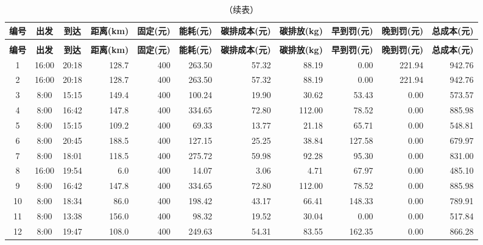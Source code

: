 \begin{landscape}
\scriptsize
\setlength{\tabcolsep}{3pt}
\begin{longtable}{|c|c|c|r|r|r|r|r|r|r|r|}
\caption{问题二完整调度方案（时间与成本明细，共163辆次）} \\
\hline
\rowcolor{gray!25}
\textbf{编号} & \textbf{出发} & \textbf{到达} & \textbf{距离(km)} & \textbf{固定(元)} & \textbf{能耗(元)} & \textbf{碳排成本(元)} & \textbf{碳排放(kg)} & \textbf{早到罚(元)} & \textbf{晚到罚(元)} & \textbf{总成本(元)} \\
\hline
\endfirsthead
\caption[]{（续表）} \\
\hline
\rowcolor{gray!25}
\textbf{编号} & \textbf{出发} & \textbf{到达} & \textbf{距离(km)} & \textbf{固定(元)} & \textbf{能耗(元)} & \textbf{碳排成本(元)} & \textbf{碳排放(kg)} & \textbf{早到罚(元)} & \textbf{晚到罚(元)} & \textbf{总成本(元)} \\
\hline
\endhead
\hline \endfoot
\hline \endlastfoot
\rowcolor{gray!8}
1 & 16:00 & 20:18 & 128.7 & 400 & 263.50 & 57.32 & 88.19 & 0.00 & 221.94 & 942.76 \\
\hline
2 & 16:00 & 20:18 & 128.7 & 400 & 263.50 & 57.32 & 88.19 & 0.00 & 221.94 & 942.76 \\
\hline
\rowcolor{gray!8}
3 & 8:00 & 15:15 & 149.4 & 400 & 100.24 & 19.90 & 30.62 & 53.43 & 0.00 & 573.57 \\
\hline
4 & 8:00 & 16:42 & 147.8 & 400 & 334.65 & 72.80 & 112.00 & 78.52 & 0.00 & 885.98 \\
\hline
\rowcolor{gray!8}
5 & 8:00 & 15:15 & 109.2 & 400 & 69.33 & 13.77 & 21.18 & 65.71 & 0.00 & 548.81 \\
\hline
6 & 8:00 & 20:45 & 188.5 & 400 & 127.15 & 25.25 & 38.84 & 127.58 & 0.00 & 679.97 \\
\hline
\rowcolor{gray!8}
7 & 8:00 & 18:01 & 118.5 & 400 & 275.72 & 59.98 & 92.28 & 95.30 & 0.00 & 831.00 \\
\hline
8 & 16:00 & 19:54 & 6.0 & 400 & 14.07 & 3.06 & 4.71 & 67.97 & 0.00 & 485.10 \\
\hline
\rowcolor{gray!8}
9 & 8:00 & 16:42 & 147.8 & 400 & 334.65 & 72.80 & 112.00 & 78.52 & 0.00 & 885.98 \\
\hline
10 & 8:00 & 18:34 & 86.0 & 400 & 198.42 & 43.17 & 66.41 & 148.33 & 0.00 & 789.91 \\
\hline
\rowcolor{gray!8}
11 & 8:00 & 13:38 & 156.0 & 400 & 98.32 & 19.52 & 30.04 & 0.00 & 0.00 & 517.84 \\
\hline
12 & 8:00 & 19:47 & 108.0 & 400 & 249.63 & 54.31 & 83.55 & 162.35 & 0.00 & 866.28 \\

\end{longtable}
\end{landscape}

